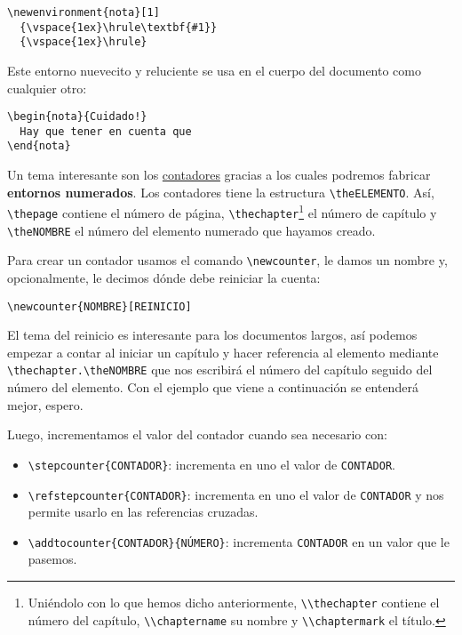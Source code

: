 \begin{lstlisting}[language={[latex]tex}]
\newenvironment{nota}[1]
  {\vspace{1ex}\hrule\textbf{#1}}
  {\vspace{1ex}\hrule}
\end{lstlisting}

Este entorno nuevecito y reluciente se usa en el cuerpo del documento
como cualquier otro:

\begin{lstlisting}[language={[latex]tex}]
\begin{nota}{Cuidado!}
  Hay que tener en cuenta que
\end{nota}
\end{lstlisting}

Un tema interesante son los
\href{https://www.sharelatex.com/learn/Counters}{contadores} gracias a
los cuales podremos fabricar \textbf{entornos numerados}. Los contadores
tiene la estructura \lstinline!\theELEMENTO!. Así, \lstinline!\thepage!
contiene el número de página, \lstinline!\thechapter!\footnote{Uniéndolo
  con lo que hemos dicho anteriormente, \lstinline!\\thechapter! contiene
  el número del capítulo, \lstinline!\\chaptername! su nombre y
  \lstinline!\\chaptermark! el título.} el número de capítulo y
\lstinline!\theNOMBRE! el número del elemento numerado que hayamos
creado.

Para crear un contador usamos el comando \lstinline!\newcounter!, le
damos un nombre y, opcionalmente, le decimos dónde debe reiniciar la
cuenta:

\begin{lstlisting}[language={[latex]tex}]
\newcounter{NOMBRE}[REINICIO]
\end{lstlisting}

El tema del reinicio es interesante para los documentos largos, así
podemos empezar a contar al iniciar un capítulo y hacer referencia al
elemento mediante \lstinline!\thechapter.\theNOMBRE! que nos escribirá
el número del capítulo seguido del número del elemento. Con el ejemplo
que viene a continuación se entenderá mejor, espero.

Luego, incrementamos el valor del contador cuando sea necesario con:

\begin{itemize}
\item
  \lstinline!\stepcounter{CONTADOR}!: incrementa en uno el valor de
  \lstinline!CONTADOR!.
\item
  \lstinline!\refstepcounter{CONTADOR}!: incrementa en uno el valor de
  \lstinline!CONTADOR! y nos permite usarlo en las referencias cruzadas.
\item
  \lstinline!\addtocounter{CONTADOR}{NÚMERO}!: incrementa
  \lstinline!CONTADOR! en un valor que le pasemos.
\end{itemize}

